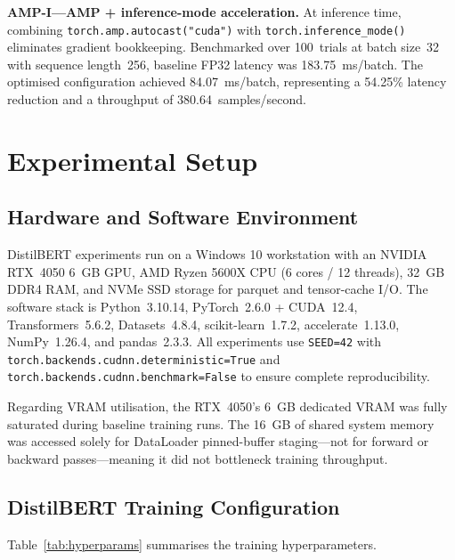 \documentclass[conference]{IEEEtran}
\begin{document}
\textbf{AMP-I---AMP + inference-mode acceleration.} At inference time, combining
\texttt{torch.amp.autocast("cuda")} with \texttt{torch.inference\_mode()} eliminates
gradient bookkeeping. Benchmarked over 100~trials at batch size~32 with sequence
length~256, baseline FP32 latency was 183.75~ms/batch. The optimised configuration
achieved 84.07~ms/batch, representing a 54.25\% latency reduction and a throughput
of 380.64~samples/second.

\section{Experimental Setup}\label{sec:setup}

\subsection{Hardware and Software Environment}

DistilBERT experiments run on a Windows 10 workstation with an NVIDIA
RTX~4050 6~GB GPU, AMD Ryzen 5600X CPU (6 cores / 12 threads), 32~GB DDR4 RAM,
and NVMe SSD storage for parquet and tensor-cache I/O. The software stack is
Python~3.10.14, PyTorch~2.6.0 + CUDA~12.4, Transformers~5.6.2,
Datasets~4.8.4, scikit-learn~1.7.2, accelerate~1.13.0, NumPy~1.26.4, and
pandas~2.3.3. All experiments use \texttt{SEED=42} with
\texttt{torch.backends.cudnn.deterministic=True} and
\texttt{torch.backends.cudnn.benchmark=False} to ensure complete
reproducibility.

Regarding VRAM utilisation, the RTX~4050's 6~GB dedicated VRAM was fully
saturated during baseline training runs. The 16~GB of shared system memory
was accessed solely for DataLoader pinned-buffer staging---not for forward
or backward passes---meaning it did not bottleneck training throughput.

\subsection{DistilBERT Training Configuration}

Table~\ref{tab:hyperparams} summarises the training hyperparameters.
\end{document}
